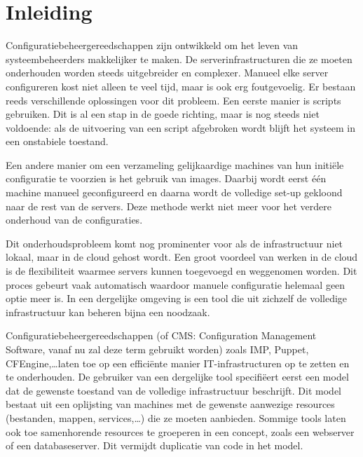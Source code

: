 \chapter{Inleiding}
\label{inleiding}
Configuratiebeheergereedschappen zijn ontwikkeld om het leven van systeembeheerders makkelijker te maken.
De serverinfrastructuren die ze moeten onderhouden worden steeds uitgebreider en complexer.
Manueel elke server configureren kost niet alleen te veel tijd, maar is ook erg foutgevoelig.
Er bestaan reeds verschillende oplossingen voor dit probleem.
Een eerste manier is scripts gebruiken.
Dit is al een stap in de goede richting, maar is nog steeds niet voldoende: 
als de uitvoering van een script afgebroken wordt blijft het systeem in een onstabiele toestand.\cite{sysadvent}

Een andere manier om een verzameling gelijkaardige machines van hun initi\"ele configuratie te voorzien is het gebruik van images.
Daarbij wordt eerst \'e\'en machine manueel geconfigureerd en daarna wordt de volledige set-up gekloond naar de rest van de servers.
Deze methode werkt niet meer voor het verdere onderhoud van de configuraties.

Dit onderhoudsprobleem komt nog prominenter voor als de infrastructuur niet lokaal, maar in de cloud gehost wordt.
Een groot voordeel van werken in de cloud is de flexibiliteit waarmee servers kunnen toegevoegd en weggenomen worden.
Dit proces gebeurt vaak automatisch waardoor manuele configuratie helemaal geen optie meer is. 
In een dergelijke omgeving is een tool die uit zichzelf de volledige infrastructuur kan beheren bijna een noodzaak.

Configuratiebeheergereedschappen (of CMS: Configuration Management Software, vanaf nu zal deze term gebruikt worden) zoals IMP\cite{IMP}, Puppet\cite{puppet}, CFEngine\cite{cfengine},\ldots laten toe op een effici\"ente manier IT-infrastructuren op te zetten en te onderhouden.
De gebruiker van een dergelijke tool specifi\"eert eerst een model dat de gewenste toestand van de volledige infrastructuur beschrijft.
Dit model bestaat uit een oplijsting van machines met de gewenste aanwezige resources (bestanden, mappen, services,\ldots) die ze moeten aanbieden.
Sommige tools laten ook toe samenhorende resources te groeperen in een concept, zoals een webserver of een databaseserver.
Dit vermijdt duplicatie van code in het model.

